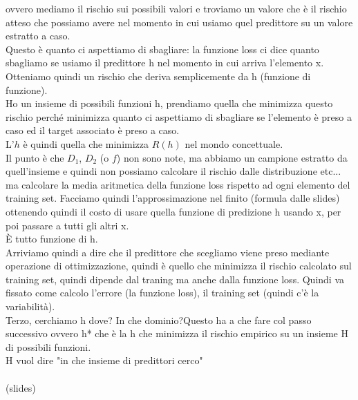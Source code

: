 \documentclass[12pt, oneside]{extbook}
\begin{document}
ovvero mediamo il rischio sui possibili valori e troviamo un valore che è il rischio atteso che possiamo avere nel momento in cui usiamo quel predittore su un valore estratto a caso.\\Questo è quanto ci aspettiamo di sbagliare: la funzione loss ci dice quanto sbagliamo se usiamo il predittore h nel momento in cui arriva l'elemento x.\\Otteniamo quindi un rischio che deriva semplicemente da h (funzione di funzione).\\Ho un insieme di possibili funzioni h, prendiamo quella che minimizza questo rischio perché minimizza quanto ci aspettiamo di sbagliare se l'elemento è preso a caso ed il target associato è preso a caso.\\L'$h$ è quindi quella che minimizza $R(h)$ nel mondo concettuale.\\Il punto è che $D_1$, $D_2$ (o $f$) non sono note, ma abbiamo un campione estratto da quell'insieme e quindi non possiamo calcolare il rischio dalle distribuzione etc... ma calcolare la media aritmetica della funzione loss rispetto ad ogni elemento del training set. Facciamo quindi l'approssimazione nel finito (formula dalle slides) ottenendo quindi il costo di usare quella funzione di predizione h usando x, per poi passare a tutti gli altri x.\\È tutto funzione di h.\\Arriviamo quindi a dire che il predittore che scegliamo viene preso mediante operazione di ottimizzazione, quindi è quello che minimizza il rischio calcolato sul training set, quindi dipende dal traning ma anche dalla funzione loss. Quindi va fissato come calcolo l'errore (la funzione loss), il training set (quindi c'è la variabilità).\\Terzo, cerchiamo h dove? In che dominio?Questo ha a che fare col passo successivo ovvero h* che è la h che minimizza il rischio empirico su un insieme H di possibili funzioni.\\H vuol dire "in che insieme di predittori cerco"\\\\ (slides)
	
	
	
	
	
	
	
	
	
	
	
	
	
	
	
	
	
	
	
	
	
	
	
	
	
	
	
\end{document}
